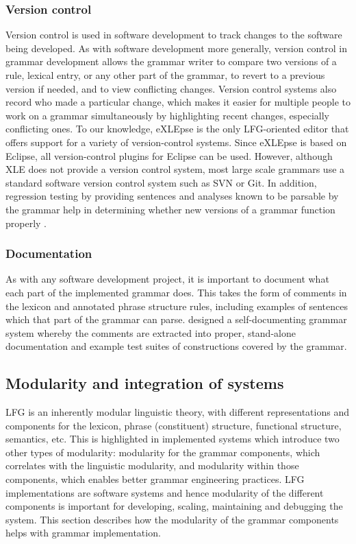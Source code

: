 \documentclass[output=paper,hidelinks]{langscibook}
\begin{document}
\subsubsection{Version control} Version control is used in software development to track changes to the software being developed. As with software development more generally, version control in grammar development allows the grammar writer to compare two versions of a rule, lexical entry, or any other part of the grammar, to revert  to a previous version if needed, and to view conflicting changes. Version control systems also record who made a particular change, which makes it easier for multiple people to work on a grammar simultaneously by highlighting recent changes, especially conflicting ones. To our knowledge, eXLEpse \citep{Radle2011eXLEp-30056} is the only LFG-oriented editor that offers support for a variety of version-control systems. Since eXLEpse is based on Eclipse, all version-control plugins for Eclipse can be used. However, although XLE does not provide a version control system, most large scale grammars use a standard software version control system such as SVN or Git. In addition, regression testing by providing sentences and analyses known to be parsable by the grammar help in determining whether new versions of a grammar function properly \citep{chatzetal07,depaivaking08}.
        
\subsubsection{Documentation} As with any software development project, it is important to document what each part of the implemented grammar does. This takes the form of comments in the lexicon and annotated phrase structure rules, including examples of sentences which that part of the grammar can parse. \cite{dipper03} designed a self-documenting grammar system whereby the comments are extracted into proper, stand-alone documentation and example test suites of constructions covered by the grammar.
       

% 
\subsection{Modularity and integration of  systems}


LFG is an inherently modular linguistic theory, with different representations and components for the lexicon, phrase (constituent) structure, functional structure, semantics, etc. This  is highlighted in implemented systems which introduce two other types of modularity: modularity for the grammar components, which correlates with the linguistic modularity, and modularity within those components, which enables better grammar engineering practices. LFG implementations are software systems and hence modularity of the different components is important for developing, scaling, maintaining and debugging the system.  This section describes how the modularity of the grammar components helps with grammar implementation.
       
\end{document}
